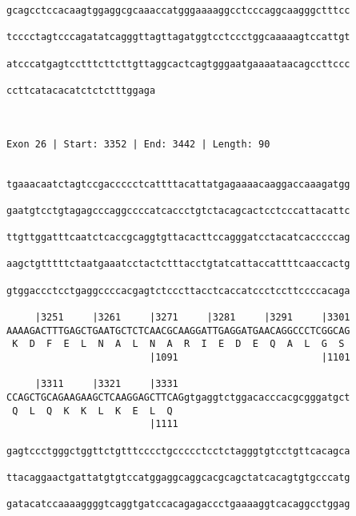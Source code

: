 \documentclass{article}
\begin{document}
\begin{Verbatim}
gcagcctccacaagtggaggcgcaaaccatgggaaaaggcctcccaggcaagggctttcc
                                                            
tcccctagtcccagatatcagggttagttagatggtcctccctggcaaaaagtccattgt
                                                            
atcccatgagtcctttcttcttgttaggcactcagtgggaatgaaaataacagccttccc
                                                            
ccttcatacacatctctctttggaga
                          
                          
 
Exon 26 | Start: 3352 | End: 3442 | Length: 90


tgaaacaatctagtccgaccccctcattttacattatgagaaaacaaggaccaaagatgg
                                                            
gaatgtcctgtagagcccaggccccatcaccctgtctacagcactcctcccattacattc
                                                            
ttgttggatttcaatctcaccgcaggtgttacacttccagggatcctacatcacccccag
                                                            
aagctgtttttctaatgaaatcctactctttacctgtatcattaccattttcaaccactg
                                                            
gtggaccctcctgaggccccacgagtctcccttacctcaccatccctccttccccacaga
                                                            
     |3251     |3261     |3271     |3281     |3291     |3301
AAAAGACTTTGAGCTGAATGCTCTCAACGCAAGGATTGAGGATGAACAGGCCCTCGGCAG
 K  D  F  E  L  N  A  L  N  A  R  I  E  D  E  Q  A  L  G  S 
                         |1091                         |1101
  
     |3311     |3321     |3331                              
CCAGCTGCAGAAGAAGCTCAAGGAGCTTCAGgtgaggtctggacacccacgcgggatgct
 Q  L  Q  K  K  L  K  E  L  Q                               
                         |1111                              
  
gagtccctgggctggttctgtttcccctgccccctcctctagggtgtcctgttcacagca
                                                            
ttacaggaactgattatgtgtccatggaggcaggcacgcagctatcacagtgtgcccatg
                                                            
gatacatccaaaaggggtcaggtgatccacagagaccctgaaaaggtcacaggcctggag
                                                            

\end{Verbatim}
\end{document}
